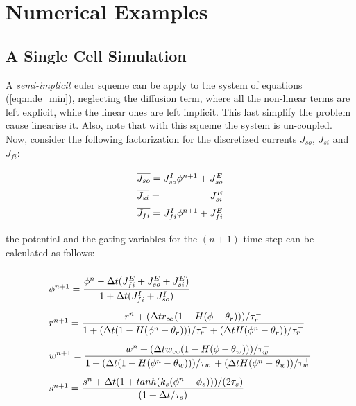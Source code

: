 \newpage
\section{Numerical Examples}


\subsection{A Single Cell Simulation}

A \textsl{semi-implicit} euler squeme can be apply to the system of equations (\ref{eq:mde_min}), neglecting the diffusion term, where all the non-linear terms are left explicit, while the linear ones are left implicit. This last simplify the problem cause linearise it. Also, note that with this squeme the system is un-coupled. Now, consider the following factorization for the discretized currents $\overline{J_{so}}$, $\overline{J_{si}}$ and $\overline{J_{fi}}$:

\begin{equation}
\arraycolsep=1.4pt\def\arraystretch{1.5}
\begin{array}{lr}
\overline{J_{so}} = & J_{so}^I \phi^{n+1} + J_{so}^E \\
\overline{J_{si}} = & J_{si}^E \\
\overline{J_{fi}} = & J_{fi}^I \phi^{n+1} + J_{fi}^E
\end{array} \label{eq:current_factorization}
\end{equation}

the potential and the gating variables for the $(n+1)$-time step can be calculated as follows:

\begin{equation}
\arraycolsep=1.4pt\def\arraystretch{2.8}
\begin{array}{l}
\phi^{n + 1} =  \dfrac{\phi^n - \Delta t (J_{fi}^E + J_{so}^E + J_{si}^E)}{1 + \Delta t (J_{fi}^I + J_{so}^I)} \\ 

r^{n+1} = \dfrac{r^n + (\Delta t r_{\infty}(1 - H(\phi - \theta_r)))/\tau_r^-}{1  +  (\Delta t (1 - H(\phi^n - \theta_r)))/\tau_r^- + (\Delta t H(\phi^n - \theta_r))/\tau_r^+} \\

w^{n+1} = \dfrac{w^n + (\Delta t w_{\infty}(1 - H(\phi - \theta_w)))/\tau_w^-}{1  +  (\Delta t (1 - H(\phi^n - \theta_w)))/\tau_w^- + (\Delta t H(\phi^n - \theta_w))/\tau_w^+} \\
   
s^{n+1} = \dfrac{s^n + \Delta t (1 + tanh(k_s (\phi^n - \phi_s)))/(2 \tau_s)}{(1 + \Delta t / \tau_s)}
\end{array} \label{eq:mde_min_imp}
\end{equation}

